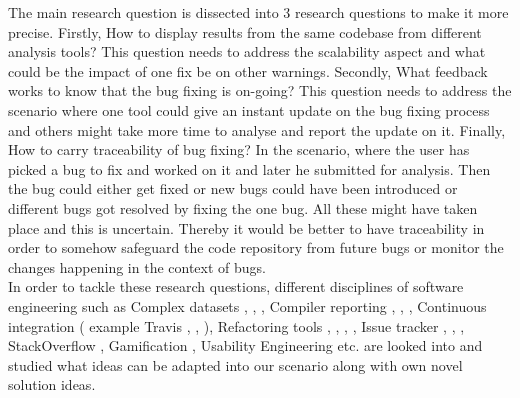 The main research question is dissected into 3 research questions to make it more precise. Firstly, How to display results from the same codebase from different analysis tools?  This question needs to address the scalability aspect and what could be the impact of one fix be on other warnings. Secondly, What feedback works to know that the bug fixing is on-going? This question needs to address the scenario where one tool could give an instant update on the bug fixing process and others might take more time to analyse and report the update on it. Finally, How to carry traceability of bug fixing? In the scenario, where the user has picked a bug to fix and worked on it and later he submitted for analysis. Then the bug could either get fixed or new bugs could have been introduced or different bugs got resolved by fixing the one bug. All these might have taken place and this is uncertain. Thereby it would be better to have traceability in order to somehow safeguard the code repository from future bugs or monitor the changes happening in the context of bugs. \\

In order to tackle these research questions, different disciplines of software engineering such as Complex datasets \cite{Dix}, \cite{Ruan}, \cite{Gaur}, Compiler reporting \cite{horning}, \cite{Sun}, \cite{Yannis}, Continuous integration \cite{Stahl} ( example Travis \cite{Beller}, \cite{Gallaba}, \cite{Widder}), Refactoring tools \cite{dustinca}, \cite{Hayashi}, \cite{Mealy}, \cite{Pinto}, Issue tracker \cite{Baysal}, \cite{Jayarajah}, \cite{Raza}, StackOverflow \cite{stack} \cite{Treude.2011}, Gamification \cite{gamify} , Usability Engineering \cite{usability} etc. are looked into and studied what ideas can be adapted into our scenario along with own novel solution ideas. \\ \\

\let\cleardoublepage\clearpage
